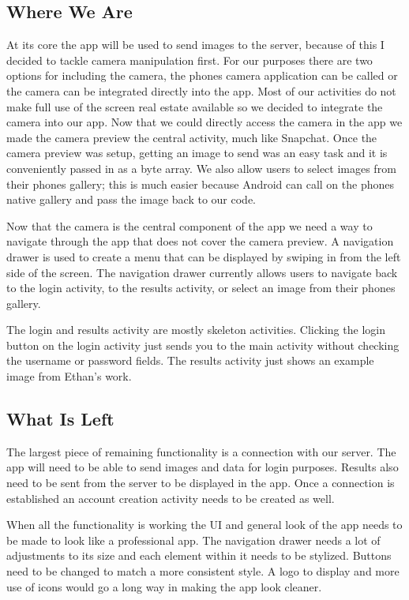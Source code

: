 \documentclass[onecolumn, draftclsnofoot,10pt, compsoc]{IEEEtran}
\begin{document}
	\subsection{Where We Are}
		At its core the app will be used to send images to the server, because of this I decided to tackle camera manipulation first.
		For our purposes there are two options for including the camera, the phones camera application can be called or the camera can be integrated directly into the app.
		Most of our activities do not make full use of the screen real estate available so we decided to integrate the camera into our app.
		Now that we could directly access the camera in the app we made the camera preview the central activity, much like Snapchat.
		Once the camera preview was setup, getting an image to send was an easy task and it is conveniently passed in as a byte array.
		We also allow users to select images from their phones gallery; this is much easier because Android can call on the phones native gallery and pass the image back to our code.

		Now that the camera is the central component of the app we need a way to navigate through the app that does not cover the camera preview.
		A navigation drawer is used to create a menu that can be displayed by swiping in from the left side of the screen.
		The navigation drawer currently allows users to navigate back to the login activity, to the results activity, or select an image from their phones gallery.

		The login and results activity are mostly skeleton activities.
		Clicking the login button on the login activity just sends you to the main activity without checking the username or password fields.
		The results activity just shows an example image from Ethan's work.

	\subsection{What Is Left}
		The largest piece of remaining functionality is a connection with our server.
		The app will need to be able to send images and data for login purposes.
		Results also need to be sent from the server to be displayed in the app.
		Once a connection is established an account creation activity needs to be created as well.

		When all the functionality is working the UI and general look of the app needs to be made to look like a professional app.
		The navigation drawer needs a lot of adjustments to its size and each element within it needs to be stylized.
		Buttons need to be changed to match a more consistent style.
		A logo to display and more use of icons would go a long way in making the app look cleaner.

		



\end{document}
